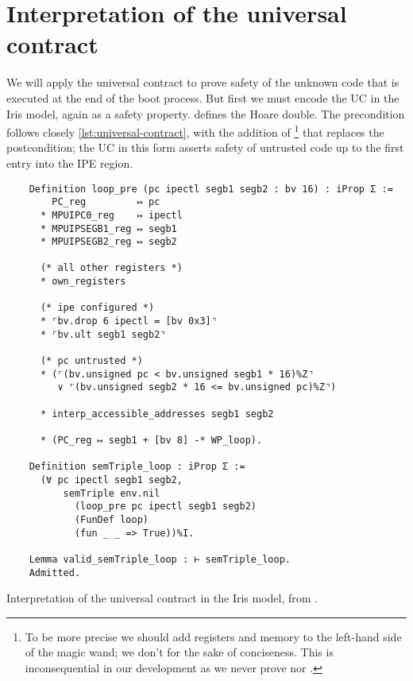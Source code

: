 \section{Interpretation of the universal contract}

We will apply the universal contract to prove safety of the unknown code that is executed at the end of the boot process. But first we must encode the UC in the Iris model, again as a safety property.  defines the Hoare double. The precondition follows closely \cref{lst:universal-contract}, with the addition of \footnote{To be more precise we should add registers and memory to the left-hand side of the magic wand; we don't for the sake of conciseness. This is inconsequential in our development as we never prove  nor .} that replaces the postcondition; the UC in this form asserts safety of untrusted code up to the first entry into the IPE region.

\begin{listing}
  \begin{verbatim}
    Definition loop_pre (pc ipectl segb1 segb2 : bv 16) : iProp Σ :=
        PC_reg         ↦ pc
      * MPUIPC0_reg    ↦ ipectl
      * MPUIPSEGB1_reg ↦ segb1
      * MPUIPSEGB2_reg ↦ segb2

      (* all other registers *)
      * own_registers

      (* ipe configured *)
      * ⌜bv.drop 6 ipectl = [bv 0x3]⌝
      * ⌜bv.ult segb1 segb2⌝

      (* pc untrusted *)
      * (⌜(bv.unsigned pc < bv.unsigned segb1 * 16)%Z⌝
         ∨ ⌜(bv.unsigned segb2 * 16 <= bv.unsigned pc)%Z⌝)

      * interp_accessible_addresses segb1 segb2

      * (PC_reg ↦ segb1 + [bv 8] -* WP_loop).

    Definition semTriple_loop : iProp Σ :=
      (∀ pc ipectl segb1 segb2,
          semTriple env.nil
            (loop_pre pc ipectl segb1 segb2)
            (FunDef loop)
            (fun _ _ => True))%I.

    Lemma valid_semTriple_loop : ⊢ semTriple_loop.
    Admitted.
  \end{verbatim}
  \caption{Interpretation of the universal contract in the Iris model, from .}
  \label{lst:loop-verification}
\end{listing}

